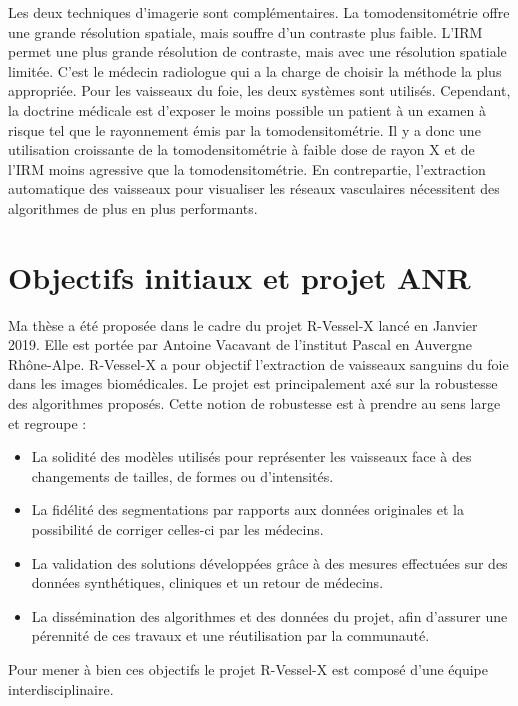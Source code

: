 Les deux techniques d'imagerie sont complémentaires. La tomodensitométrie offre une grande résolution spatiale, mais souffre d'un contraste plus faible. L'IRM permet une plus grande résolution de contraste, mais avec une résolution spatiale limitée. C'est le médecin radiologue qui a la charge de choisir la méthode la plus appropriée. Pour les vaisseaux du foie, les deux systèmes sont utilisés. Cependant, la doctrine médicale est d'exposer le moins possible un patient à un examen à risque tel que le rayonnement émis par la tomodensitométrie. Il y a donc une utilisation croissante de la tomodensitométrie à faible dose de rayon X et  de l'IRM moins agressive que la tomodensitométrie. En contrepartie, l'extraction automatique des vaisseaux pour visualiser les réseaux vasculaires nécessitent des algorithmes de plus en plus performants.

\section{Objectifs initiaux et projet ANR}
\label{sec:introduction:objectifs}

Ma thèse a été proposée dans le cadre du projet R-Vessel-X lancé en Janvier 2019. Elle est portée par Antoine Vacavant de l'institut Pascal en Auvergne Rhône-Alpe. R-Vessel-X a pour objectif l'extraction de vaisseaux sanguins du foie dans les images biomédicales. Le projet est principalement axé sur la robustesse des algorithmes proposés. Cette notion de robustesse est à prendre au sens large et regroupe :

\begin{itemize}
\item La solidité des modèles utilisés pour représenter les vaisseaux face à des changements de tailles, de formes ou d'intensités.
\item La fidélité des segmentations par rapports aux données originales et la possibilité de corriger celles-ci par les médecins.
\item La validation des solutions développées grâce à des mesures effectuées sur des données synthétiques, cliniques et un retour de médecins.
\item La dissémination des algorithmes et des données du projet, afin d'assurer une pérennité de ces travaux et une réutilisation par la communauté.
\end{itemize}

Pour mener à bien ces objectifs le projet R-Vessel-X est composé d'une équipe interdisciplinaire.

